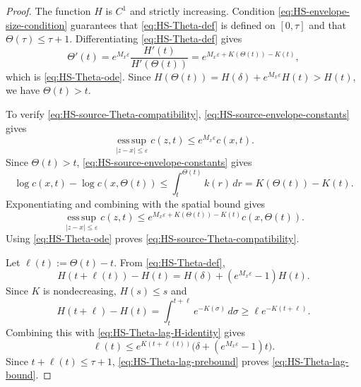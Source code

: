 \documentclass[11pt]{amsart}
\numberwithin{equation}{section}
\numberwithin{figure}{section}
\theoremstyle{plain}
\theoremstyle{definition}
\theoremstyle{remark}
\theoremstyle{plain}
\newcommand{\abs}[1]{\lvert #1 \rvert}
\newcommand{\vep}{\varepsilon}
\begin{document}
\begin{proof}
The function \(H\) is \(C^1\) and strictly increasing.  Condition
\eqref{eq:HS-envelope-size-condition} guarantees that
\eqref{eq:HS-Theta-def} is defined on \([0,\tau]\) and that
\(\Theta(\tau)\leq \tau+1\).  Differentiating \eqref{eq:HS-Theta-def} gives
\[
    \Theta'(t)=e^{M_x\vep}\frac{H'(t)}{H'(\Theta(t))}
    =e^{M_x\vep+K(\Theta(t))-K(t)},
\]
which is \eqref{eq:HS-Theta-ode}.  Since
\(H(\Theta(t))=H(\delta)+e^{M_x\vep}H(t)>H(t)\), we have \(\Theta(t)>t\).

To verify \eqref{eq:HS-source-Theta-compatibility},
\eqref{eq:HS-source-envelope-constants} gives
\[
    \operatorname*{ess\,sup}_{\abs{z-x}\leq\vep}c(z,t)
    \leq e^{M_x\vep}c(x,t).
\]
Since \(\Theta(t)>t\), \eqref{eq:HS-source-envelope-constants} gives
\[
    \log c(x,t)-\log c(x,\Theta(t))
    \leq \int_t^{\Theta(t)}k(r)\,dr
    =K(\Theta(t))-K(t).
\]
Exponentiating and combining with the spatial bound gives
\begin{equation}\label{eq:HS-source-multiplicative-control}
    \operatorname*{ess\,sup}_{\abs{z-x}\leq\vep}c(z,t)
    \leq e^{M_x\vep+K(\Theta(t))-K(t)}c(x,\Theta(t)).
\end{equation}
Using \eqref{eq:HS-Theta-ode} proves \eqref{eq:HS-source-Theta-compatibility}.

Let \(\ell(t):=\Theta(t)-t\).  From \eqref{eq:HS-Theta-def},
\begin{equation}\label{eq:HS-Theta-lag-H-identity}
    H(t+\ell(t))-H(t)=H(\delta)+(e^{M_x\vep}-1)H(t).
\end{equation}
Since \(K\) is nondecreasing, \(H(s)\leq s\) and
\[
    H(t+\ell)-H(t)
    =\int_t^{t+\ell}e^{-K(\sigma)}\,d\sigma
    \geq \ell e^{-K(t+\ell)}.
\]
Combining this with \eqref{eq:HS-Theta-lag-H-identity} gives
\begin{equation}\label{eq:HS-Theta-lag-prebound}
    \ell(t)
    \leq e^{K(t+\ell(t))}
    \bigl(\delta+(e^{M_x\vep}-1)t\bigr).
\end{equation}
Since \(t+\ell(t)\leq \tau+1\), \eqref{eq:HS-Theta-lag-prebound} proves
\eqref{eq:HS-Theta-lag-bound}.
\end{proof}
\end{document}

